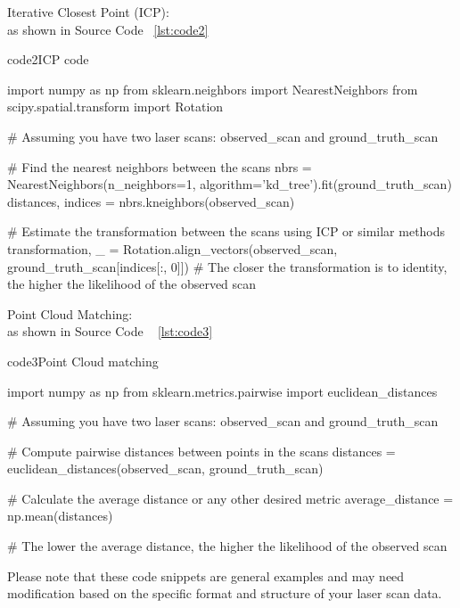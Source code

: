 \documentclass[]{article}
\begin{document}
Iterative Closest Point (ICP):
\\
as shown in Source Code ~\ref{lst:code2}

\begin{pythoncode}{code2}{ICP code}
	
import numpy as np
from sklearn.neighbors import NearestNeighbors
from scipy.spatial.transform import Rotation

# Assuming you have two laser scans: observed_scan and ground_truth_scan

# Find the nearest neighbors between the scans
nbrs = NearestNeighbors(n_neighbors=1, algorithm='kd_tree').fit(ground_truth_scan)
distances, indices = nbrs.kneighbors(observed_scan)

# Estimate the transformation between the scans using ICP or similar methods
transformation, _ = Rotation.align_vectors(observed_scan, ground_truth_scan[indices[:, 0]])
# The closer the transformation is to identity, the higher the likelihood of the observed scan

\end{pythoncode}


Point Cloud Matching:
\\
as shown in Source Code ~ \ref{lst:code3}



\begin{pythoncode}{code3}{Point Cloud matching}


import numpy as np
from sklearn.metrics.pairwise import euclidean_distances

# Assuming you have two laser scans: observed_scan and ground_truth_scan

# Compute pairwise distances between points in the scans
distances = euclidean_distances(observed_scan, ground_truth_scan)

# Calculate the average distance or any other desired metric
average_distance = np.mean(distances)

# The lower the average distance, the higher the likelihood of the observed scan
\end{pythoncode}

Please note that these code snippets are general examples and may need modification based on the specific format and structure of your laser scan data.
\end{document}
